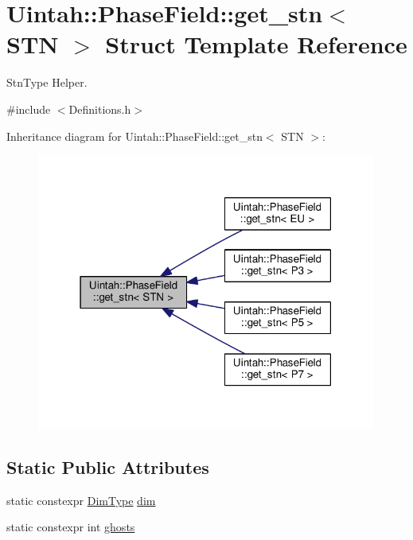 \hypertarget{structUintah_1_1PhaseField_1_1get__stn}{}\section{Uintah\+:\+:Phase\+Field\+:\+:get\+\_\+stn$<$ S\+TN $>$ Struct Template Reference}
\label{structUintah_1_1PhaseField_1_1get__stn}


Stn\+Type Helper.  




{\ttfamily \#include $<$Definitions.\+h$>$}



Inheritance diagram for Uintah\+:\+:Phase\+Field\+:\+:get\+\_\+stn$<$ S\+TN $>$\+:\nopagebreak
\begin{figure}[H]
\begin{center}
\leavevmode
\includegraphics[width=316pt]{structUintah_1_1PhaseField_1_1get__stn__inherit__graph}
\end{center}
\end{figure}
\subsection*{Static Public Attributes}
\begin{DoxyCompactItemize}
\item 
static constexpr \hyperlink{namespaceUintah_1_1PhaseField_a12bfc68444894dffdf0cb8d9cf0cc76a}{Dim\+Type} \hyperlink{structUintah_1_1PhaseField_1_1get__stn_a750e0efa7ab05525da0069da316ebae7}{dim}
\item 
static constexpr int \hyperlink{structUintah_1_1PhaseField_1_1get__stn_ab0af4afe766520c639bdc3528e577018}{ghosts}
\end{DoxyCompactItemize}


